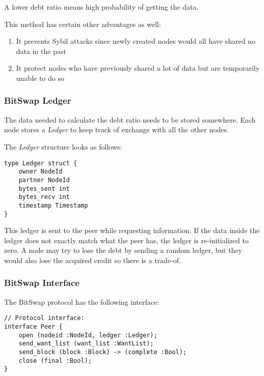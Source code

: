 A lower debt ratio means high probability of getting the data.

This method has certain other advantages as well:
\begin{enumerate}
    \item It prevents Sybil attacks since newly created nodes would all have shared no data in the past
    \item It protect nodes who have previously shared a lot of data but are temporarily unable to do so
\end{enumerate}

\subsubsection{BitSwap Ledger}

The data needed to calculate the debt ratio needs to be stored somewhere. Each node stores a \textit{Ledger} to keep track of exchange with all the other nodes.

The \textit{Ledger} structure looks as follows:

\begin{verbatim}
type Ledger struct {
    owner NodeId
    partner NodeId
    bytes_sent int
    bytes_recv int
    timestamp Timestamp
}
\end{verbatim}

This ledger is sent to the peer while requesting information. If the data inside the ledger does not exactly match what the peer has, the ledger is re-initialized to zero. A node may try to lose the debt by sending a random ledger, but they would also lose the acquired credit so there is a trade-of.

\subsubsection{BitSwap Interface}

The BitSwap protocol has the following interface:

\begin{verbatim}
// Protocol interface:
interface Peer {
    open (nodeid :NodeId, ledger :Ledger);
    send_want_list (want_list :WantList);
    send_block (block :Block) -> (complete :Bool);
    close (final :Bool);
}
\end{verbatim}

